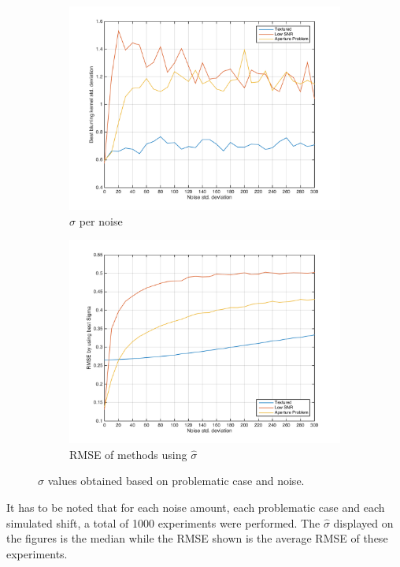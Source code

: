 \begin{figure}[!ht]
	\centering
	\begin{subfigure}{0.45\textwidth}
	\includegraphics[width=1\textwidth]{Results/BestSigmaByImageTypeAndNoise}
	\caption{$\hat{\sigma}$ per noise}
	\end{subfigure}
	\begin{subfigure}{0.45\textwidth}
	\includegraphics[width=1\textwidth]{Results/RMSEByImageTypeAndNoise}
	\caption{RMSE of methods using $\hat{\sigma}$}
	\label{subfig:BestSigmaByImageTypeAndNoiseB}
	\end{subfigure}
	\caption{$\hat{\sigma}$ values obtained based on problematic case and noise.}
	\label{fig:BestSigmaByImageTypeAndNoise}
\end{figure}
It has to be noted that for each noise amount, each problematic case and each simulated shift, a total of 1000 experiments were performed. The $\hat{\sigma}$ displayed on the figures is the median while the RMSE shown is the average RMSE of these experiments.

